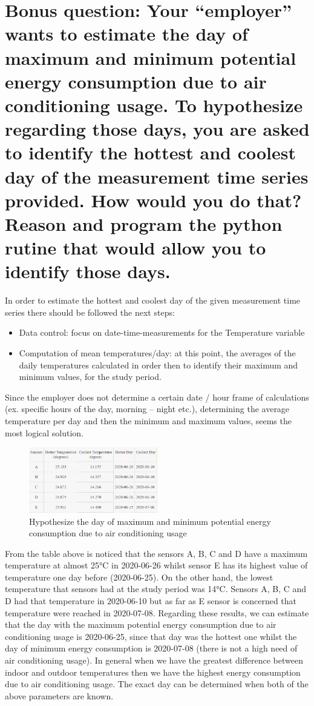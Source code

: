 \documentclass[a4paper]{article}
\begin{document}
\section{Bonus question: Your “employer” wants to estimate the day of maximum and minimum potential energy consumption due to air conditioning usage. To hypothesize regarding those days, you are asked to identify the hottest and coolest day of the measurement time series provided. How would you do that? Reason and program the python rutine that would allow you to identify those days.} 

In order to estimate the hottest and coolest day of the given measurement time series there should be followed the next steps:
\begin{itemize}
    \item Data control: focus on date-time-measurements for the Temperature variable
    \item Computation of mean temperatures/day: at this point, the averages of the daily temperatures calculated in order then to identify their maximum and minimum values, for the study period.
\end{itemize}

Since the employer does not determine a certain date / hour frame of calculations (ex. specific hours of the day, morning – night etc.), determining the average temperature per day and then the minimum and maximum values, seems the most logical solution. 

\begin{figure}[H]
\centering
    \includegraphics[width=0.5\textwidth]{images/bonus.PNG}
    \caption{Hypothesize the day of maximum and minimum potential energy consumption due to air conditioning usage}
    \label{fig:Confidence intervals}
\end{figure}

From the table above is noticed that the sensors A, B, C and D have a maximum temperature at almost 25°C in 2020-06-26 whilst sensor E has its highest value of temperature one day before (2020-06-25). On the other hand, the lowest temperature that sensors had at the study period was 14°C. Sensors A, B, C and D had that temperature in 2020-06-10 but as far as E sensor is concerned that temperature were reached in 2020-07-08. Regarding these results, we can estimate that the day with the maximum potential energy consumption due to air conditioning usage is 2020-06-25, since that day was the hottest one whilst the day of minimum energy consumption is 2020-07-08 (there is not a high need of air conditioning usage). 
In general when we have the greatest difference between indoor and outdoor temperatures then we have the highest energy consumption due to air conditioning usage. The exact day can be determined when both of the above parameters are known. 




\end{document}
